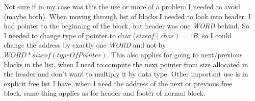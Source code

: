 \documentclass[a4paper]{article}
\begin{document}
Not sure if in my case was this the use or more of a problem I needed to avoid (maybe both).
When moving through list of blocks I needed to look into header. I had pointer to the beginning
of the block, but header was one \textit{WORD} behind. So I needed to change type of pointer to
char ($sizeof(char) = 1B$, so I could change the address by exactly one \textit{WORD} and not by
$WORD * sizeof(typeOfPointer)$. This also applies for going to next/previous blocks in the list, 
when I need to compute the next pointer from size allocated in the header and don't want to
multiply it by data type. Other important use is in explicit free list I have, when I need
the address of the next or previous free block, same thing applies as for header and footer
of normal block.

\newpage
\end{document}
